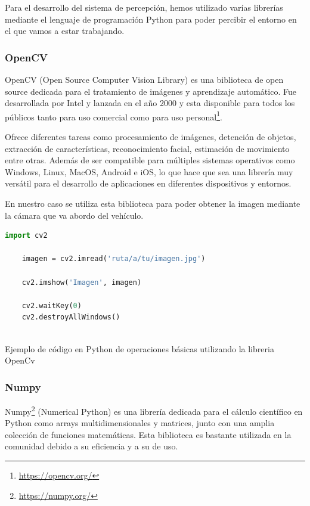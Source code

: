 Para el desarrollo del sistema de percepción, hemos utilizado varías librerías mediante el lenguaje de programación Python para poder
percibir el entorno en el que vamos a estar trabajando. 
\subsubsection{OpenCV}
\label{sec:OpenCV}
OpenCV (Open Source Computer Vision Library) es una biblioteca de open source dedicada para el tratamiento de imágenes y aprendizaje automático. Fue desarrollada por Intel y lanzada en 
el año 2000 y esta disponible para todos los públicos tanto para uso comercial como para uso personal\footnote{\url{https://opencv.org/}}.

Ofrece diferentes tareas como procesamiento de imágenes, detención de objetos, extracción de características, reconocimiento facial, estimación de movimiento entre otras. Además de ser
compatible para múltiples sistemas operativos como Windows, Linux, MacOS, Android e iOS, lo que hace que sea una librería muy versátil para el desarrollo de aplicaciones en diferentes
dispositivos y entornos. \newline

En nuestro caso se utiliza esta biblioteca para poder obtener la imagen mediante la cámara que va abordo del vehículo.

\begin{code}[h]
  \begin{lstlisting}[language=Python]
    import cv2

    imagen = cv2.imread('ruta/a/tu/imagen.jpg')
    
    cv2.imshow('Imagen', imagen)
    
    cv2.waitKey(0)
    cv2.destroyAllWindows()
    
  \end{lstlisting}
  \caption[Ejemplo de código en Python de operaciones básicas utilizando la librería OpenCv]{Ejemplo de código en Python de operaciones básicas utilizando la libreria OpenCv}
  \label{cod:Numpy}
  \end{code}  

\subsubsection{Numpy}
\label{sec:Numpy}

Numpy\footnote{\url{https://numpy.org/}} (Numerical Python) es una librería dedicada para el cálculo científico en Python como arrays multidimensionales y matrices, junto con una amplia
colección de funciones matemáticas. Esta biblioteca es bastante utilizada en la comunidad debido a su eficiencia y a su de uso. 

